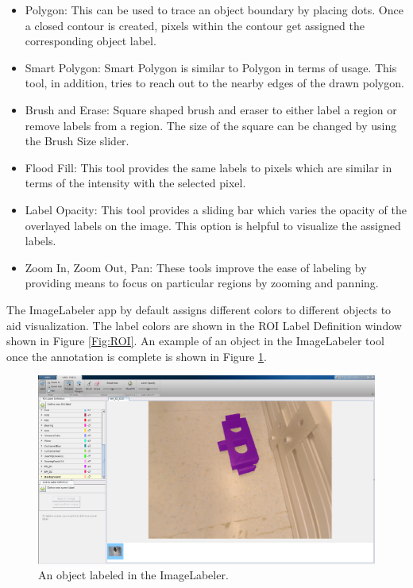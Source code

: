 	\begin{itemize}
		\item Polygon: This can be used to trace an object boundary by placing dots. Once a closed contour is created, pixels within the contour get assigned the corresponding object label.
		\item Smart Polygon: Smart Polygon is similar to Polygon in terms of usage. This tool, in addition, tries to reach out to the nearby edges of the drawn polygon.
		\item Brush and Erase: Square shaped brush and eraser to either label a region or remove labels from a region. The size of the square can be changed by using the Brush Size slider.
		\item Flood Fill: This tool provides the same labels to pixels which are similar in terms of the intensity with the selected pixel.
		\item Label Opacity: This tool provides a sliding bar which varies the opacity of the overlayed labels on the image. This option is helpful to visualize the assigned labels.
		\item Zoom In, Zoom Out, Pan: These tools improve the ease of labeling by providing means to focus on particular regions by zooming and panning.
	\end{itemize}
	
The ImageLabeler app by default assigns different colors to different objects to aid visualization. The label colors are shown in the ROI Label Definition window shown in Figure \ref{Fig:ROI}. An example of an object in the ImageLabeler tool once the annotation is complete is shown in Figure \ref{Fig:ex_ann}.
	
	\begin{figure}
		\centering
		\includegraphics[scale=0.2]{images/imglabler_eg}
		\caption{An object labeled in the ImageLabeler.}
		\label{Fig:ex_ann}
	\end{figure}
	
